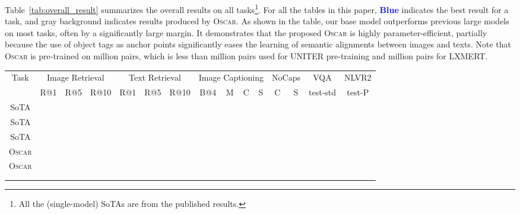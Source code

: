 \documentclass[runningheads]{llncs}
\newcommand{\short}{\textsc{Oscar}}
\newcommand{\shortb}{\textsc{Oscar}}
\newcommand{\shortl}{\textsc{Oscar}}
\begin{document}
Table~\ref{tab:overall_result} summarizes the overall results on all tasks\footnote{All the (single-model) SoTAs are from the published results.}. For all the tables in this paper, \textcolor{blue}{\textbf{Blue}} indicates the best result for a task, and gray background indicates results produced by \short{}. As shown in the table, our base model outperforms previous large models on most tasks, often by a significantly large margin. It demonstrates that the proposed \short{} is highly parameter-efficient, partially because the use of object tags as anchor points significantly eases the learning of semantic alignments between images and texts.
Note that \short{} is pre-trained on  million pairs, which is less than  million pairs used for UNITER pre-training and  million pairs for LXMERT.






\begin{table*}[t!]
\begin{center}
\caption{
Overall results on six tasks.  indicates the improvement over SoTA. SoTA with subscript S, B, L indicates performance achieved by small models, VLP of similar size to BERT base and large model, respectively. Most results are from~\cite{chen2019uniter}, except that image captioning results are from\cite{huang2019attention,zhou2019unified}, NoCaps results are from~\cite{agrawal2019nocaps}, VQA results are from~\cite{tan2019lxmert}.}
\scriptsize
\label{tab:overall_result}
\begin{tabular}{cccc|ccc|cccc|cc|c|c}
\toprule
\multirow{2}{*}{Task} & \multicolumn{3}{c|}{Image Retrieval} & \multicolumn{3}{c|}{Text Retrieval} & \multicolumn{4}{c|}{Image Captioning} & \multicolumn{2}{c|}{NoCaps} & VQA & NLVR2 \\ 
& R@1 & R@5 & R@10 & R@1 & R@5 & R@10 & B@4 & M & C & S & C & S & test-std & test-P\\ \midrule
SoTA &  &  &  &  &  &  &  &  &  &  &  &  &  &  \\
SoTA &  &  &  &  &  &  &  &  &  &  &  &  &  & \\
SoTA &  &  &  &  &  &  &  &  &  &  &  &  &  &  \\
\hline
\rowcolor{Graylight}
\shortb{} &  &  &  &  &  &  &  &  &  &  &  & \textcolor{blue}{} &  &  \\ 
\rowcolor{Grayheavy}
\shortl{} & \textcolor{blue}{} & \textcolor{blue}{} & \textcolor{blue}{} & \textcolor{blue}{} & \textcolor{blue}{} & \textcolor{blue}{} & \textcolor{blue}{} & \textcolor{blue}{} & \textcolor{blue}{} & \textcolor{blue}{} & \textcolor{blue}{} &  & \textcolor{blue}{} & \textcolor{blue}{} \\
\hline
 &  &  &  &  &  &  &  &  &  &  &  &  &  &  \\ 
\bottomrule
\vspace{-10mm}
\end{tabular}
\end{center}
\end{table*}
\end{document}

